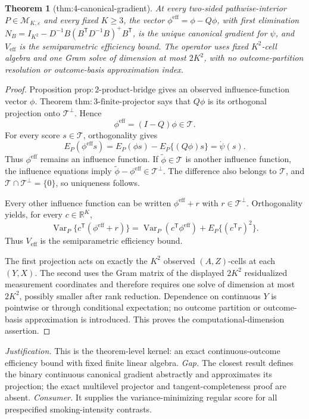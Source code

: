\documentclass{article}
\newtheorem{theorem}{Theorem}
\begin{document}
\begin{theorem}[thm:4-canonical-gradient]\label{thm:4-canonical-gradient}
At every two-sided pathwise-interior \(P\in\mathcal M_{K,\varepsilon}\) and every fixed \(K\geq3\), the vector \(\phi^{\mathrm{eff}}=\phi-Q\phi\), with first elimination \(N_B=I_{K^2}-D^{-1}B(B^{\mathsf T}D^{-1}B)^+B^{\mathsf T}\), is the unique canonical gradient for \(\psi\), and \(V_{\mathrm{eff}}\) is the semiparametric efficiency bound.  The operator uses fixed \(K^2\)-cell algebra and one Gram solve of dimension at most \(2K^2\), with no outcome-partition resolution or outcome-basis approximation index.
\end{theorem}
\begin{proof}
Proposition \(\mathrm{prop{:}2\mbox{-}product\mbox{-}bridge}\) gives an observed influence-function vector \(\phi\).  Theorem \(\mathrm{thm{:}3\mbox{-}finite\mbox{-}projector}\) says that \(Q\phi\) is its orthogonal projection onto \(\mathcal T^\perp\).  Hence
\[
 \phi^{\mathrm{eff}}=(I-Q)\phi\in\mathcal T. \tag{23}
\]
For every score \(s\in\mathcal T\), orthogonality gives
\[
 E_P(\phi^{\mathrm{eff}}s)
 =E_P(\phi s)-E_P\{(Q\phi)s\}
 =\dot\psi(s). \tag{24}
\]
Thus \(\phi^{\mathrm{eff}}\) remains an influence function.  If \(\widetilde\phi\in\mathcal T\) is another influence function, the influence equations imply
\(\widetilde\phi-\phi^{\mathrm{eff}}\in\mathcal T^\perp\).  The difference also belongs to \(\mathcal T\), and \(\mathcal T\cap\mathcal T^\perp=\{0\}\), so uniqueness follows.

Every other influence function can be written \(\phi^{\mathrm{eff}}+r\) with \(r\in\mathcal T^\perp\).  Orthogonality yields, for every \(c\in\mathbb R^K\),
\[
 \operatorname{Var}_P\{c^{\mathsf T}(\phi^{\mathrm{eff}}+r)\}
 =\operatorname{Var}_P(c^{\mathsf T}\phi^{\mathrm{eff}})
  +E_P\{(c^{\mathsf T}r)^2\}. \tag{25}
\]
Thus \(V_{\mathrm{eff}}\) is the semiparametric efficiency bound.

The first projection acts on exactly the \(K^2\) observed \((A,Z)\)-cells at each \((Y,X)\).  The second uses the Gram matrix of the displayed \(2K^2\) residualized measurement coordinates and therefore requires one solve of dimension at most \(2K^2\), possibly smaller after rank reduction.  Dependence on continuous \(Y\) is pointwise or through conditional expectation; no outcome partition or outcome-basis approximation is introduced.  This proves the computational-dimension assertion.
\end{proof}
\par\smallskip\noindent \textit{Justification.} This is the theorem-level kernel: an exact continuous-outcome efficiency bound with fixed finite linear algebra. \textit{Gap.} The closest result defines the binary continuous canonical gradient abstractly and approximates its projection; the exact multilevel projector and tangent-completeness proof are absent. \textit{Consumer.} It supplies the variance-minimizing regular score for all prespecified smoking-intensity contrasts.
\end{document}
